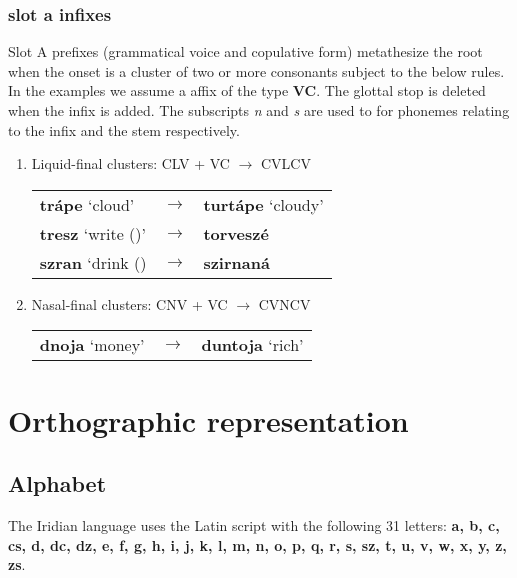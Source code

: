 \subsubsection{slot a infixes}
\par Slot A prefixes (grammatical voice and copulative form) metathesize the root when the onset is a cluster of two or more consonants subject to the below rules. In the examples we assume a affix of the type \textbf{\glot VC}. The glottal stop is deleted when the infix is added. The subscripts \textit{n} and \textit{s} are used to for phonemes relating to the infix and the stem respectively.
\begin{enumerate}
	\item Liquid-final clusters: CLV + \glot VC $\rightarrow$ CVLCV
	\begin{center}
	\begin{tabu}to 0.8\textwidth{YM[0.1]Y}
		\textbf{trápe} `cloud'&$\rightarrow$&\textbf{turtápe} `cloudy'\\
		\textbf{tresz} `write ()'&$\rightarrow$&\textbf{torveszé}\\
		\textbf{szran} `drink () &$\rightarrow$&\textbf{szirnaná}\\
	\end{tabu}
	\end{center}

	\item Nasal-final clusters: CNV + \glot VC $\rightarrow$ CVNCV
	\begin{center}
		\begin{tabu}to 0.8\textwidth{YM[0.1]Y}
			\textbf{dnoja} `money'&$\rightarrow$&\textbf{duntoja} `rich'\\
		\end{tabu}
	\end{center}
\end{enumerate}

\section{Orthographic representation}
\subsection{Alphabet}

\par The Iridian language uses the Latin script with the following 31 letters: \textbf{a, b, c, cs, d, dc, dz, e, f, g, h, i, j, k, l, m, n, o, p, q, r, s, sz, t, u, v, w, x, y, z, zs}.

